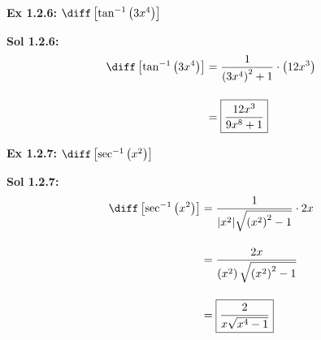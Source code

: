 \begin{center}
\end{center}

\begin{tcolorbox}[example]
    \textbf{Ex 1.2.6: } $\diff \left[\tan^{-1} \left(3x^4\right)\right]$ 
\end{tcolorbox}
\begin{tcolorbox}[solution]
    \textbf{Sol 1.2.6: } \begin{align*}
        \diff \left[\tan^{-1} \left(3x^4\right)\right] & = \dfrac{1}{\left(3x^4\right)^2 + 1} \cdot \left(12x^3\right) \\[11pt]
        & = \boxed{\dfrac{12x^3}{9x^8 + 1}}
    \end{align*}
\end{tcolorbox} \vspace{11pt}

\begin{tcolorbox}[example]
    \textbf{Ex 1.2.7: } $\diff \left[\sec^{-1} \left(x^2\right)\right]$ 
\end{tcolorbox}
\begin{tcolorbox}[solution]
        \textbf{Sol 1.2.7: } \begin{align*}
        \diff \left[\sec^{-1} \left(x^2\right)\right] & = \dfrac{1}{|x^2|\sqrt{\left(x^2\right)^2 - 1}} \cdot 2x \\[11pt]
        & = \dfrac{2x}{\left(x^2\right)\sqrt{\left(x^2\right)^2 - 1}} \\[11pt]
        & = \boxed{\dfrac{2}{x\sqrt{x^4 - 1}}}
    \end{align*}
\end{tcolorbox}

